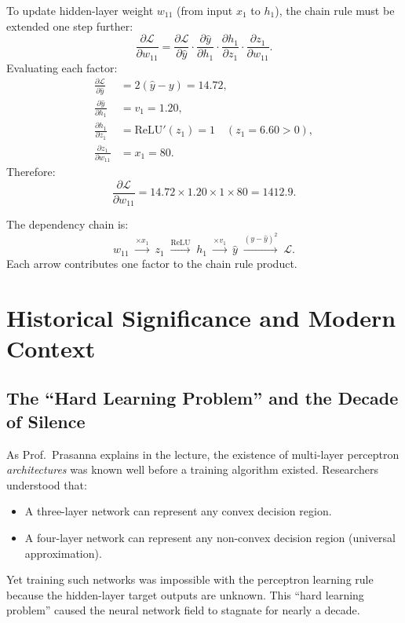 \documentclass[12pt,a4paper]{article}
\newcommand{\Loss}{\mathcal{L}}
\newcommand{\yhat}{\hat{y}}
\begin{document}
To update hidden-layer weight $w_{11}$ (from input $x_1$ to $h_1$), the
chain rule must be extended one step further:
\begin{equation}
  \frac{\partial\Loss}{\partial w_{11}}
    = \frac{\partial\Loss}{\partial\yhat}
      \cdot\frac{\partial\yhat}{\partial h_1}
      \cdot\frac{\partial h_1}{\partial z_1}
      \cdot\frac{\partial z_1}{\partial w_{11}}.
  \label{eq:chain-hidden}
\end{equation}
Evaluating each factor:
\begin{align}
  \frac{\partial\Loss}{\partial\yhat}   &= 2(\yhat - y) = 14.72, \\
  \frac{\partial\yhat}{\partial h_1}    &= v_1 = 1.20, \\
  \frac{\partial h_1}{\partial z_1}     &= \mathrm{ReLU}'(z_1) = 1 \quad (z_1 = 6.60 > 0), \\
  \frac{\partial z_1}{\partial w_{11}}  &= x_1 = 80.
  \label{eq:chain-factors}
\end{align}
Therefore:
\begin{equation}
  \frac{\partial\Loss}{\partial w_{11}}
    = 14.72 \times 1.20 \times 1 \times 80 = \mathbf{1412.9}.
  \label{eq:grad-w11}
\end{equation}

\begin{example}[title=Computation Graph for $\partial\Loss/\partial w_{11}$]
  The dependency chain is:
  \[
    w_{11}
    \;\xrightarrow{\times x_1}\; z_1
    \;\xrightarrow{\mathrm{ReLU}}\; h_1
    \;\xrightarrow{\times v_1}\; \yhat
    \;\xrightarrow{(y-\yhat)^2}\; \Loss.
  \]
  Each arrow contributes one factor to the chain rule product.
\end{example}

\section{Historical Significance and Modern Context}
\label{sec:context}

\subsection{The ``Hard Learning Problem'' and the Decade of Silence}
\label{subsec:history}

As Prof.~Prasanna explains in the lecture, the existence of multi-layer
perceptron \emph{architectures} was known well before a training algorithm
existed.  Researchers understood that:
\begin{itemize}
  \item A three-layer network can represent any convex decision region.
  \item A four-layer network can represent any non-convex decision region
    (universal approximation).
\end{itemize}
Yet training such networks was impossible with the perceptron learning rule
because the hidden-layer target outputs are unknown.  This ``hard learning
problem'' caused the neural network field to stagnate for nearly a decade.
\end{document}

